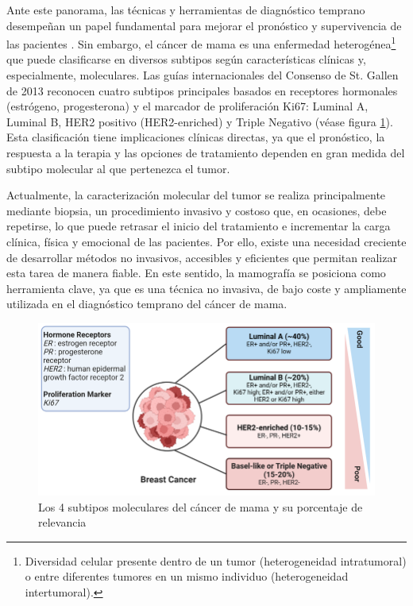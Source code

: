 \documentclass[a4paper,10pt]{book}
\begin{document}
Ante este panorama, las técnicas y herramientas de diagnóstico temprano desempeñan un papel fundamental para mejorar el pronóstico y supervivencia de las pacientes \cite{wang_early_2017}. Sin embargo, el cáncer de mama es una enfermedad heterogénea\footnote{Diversidad celular presente dentro de un tumor (heterogeneidad intratumoral) o entre diferentes tumores en un mismo individuo (heterogeneidad intertumoral).} que puede clasificarse en diversos subtipos según características clínicas y, especialmente, moleculares. Las guías internacionales del Consenso de St. Gallen de 2013 \cite{goldhirsch_personalizing_2013} reconocen cuatro subtipos principales basados en receptores hormonales (estrógeno, progesterona) y el marcador de proliferación Ki67: Luminal A, Luminal B, HER2 positivo (HER2-enriched) y Triple Negativo (véase figura \ref{fig:subtypes}). Esta clasificación tiene implicaciones clínicas directas, ya que el pronóstico, la respuesta a la terapia y las opciones de tratamiento dependen en gran medida del subtipo molecular al que pertenezca el tumor.

Actualmente, la caracterización molecular del tumor se realiza principalmente mediante biopsia, un procedimiento invasivo y costoso que, en ocasiones, debe repetirse, lo que puede retrasar el inicio del tratamiento e incrementar la carga clínica, física y emocional de las pacientes. Por ello, existe una necesidad creciente de desarrollar métodos no invasivos, accesibles y eficientes que permitan realizar esta tarea de manera fiable. En este sentido, la mamografía se posiciona como herramienta clave, ya que es una técnica no invasiva, de bajo coste y ampliamente utilizada en el diagnóstico temprano del cáncer de mama.


\begin{figure}
    \centering
    \includegraphics[width=0.8\linewidth]{reports/assets/subtypes.png}
    \caption{Los 4 subtipos moleculares del cáncer de mama y su porcentaje de relevancia \cite{harnessing_2024}}
    \label{fig:subtypes}
\end{figure}
\end{document}
